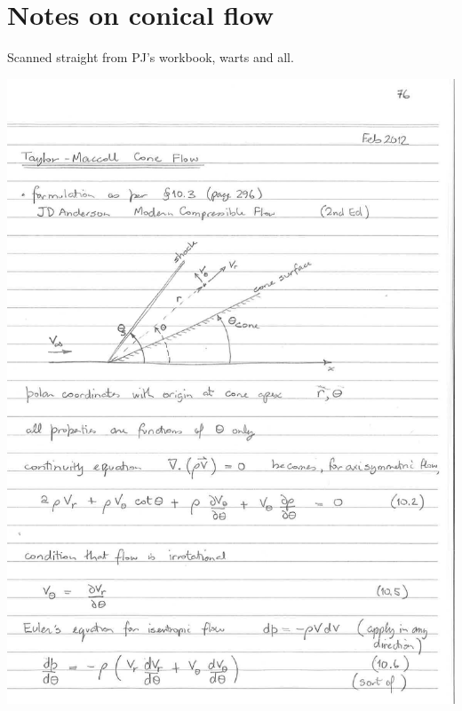 \documentclass[landscape,12pt,a4paper]{article}
\begin{document}


\newpage
\section{Notes on conical flow}
\label{pj-notes-cone-flow}
%
Scanned straight from PJ's workbook, warts and all.

\begin{center}
\includegraphics[width=0.9\textheight,angle=90]{../figs/pj-workbook-page-76.png}
\end{center}
\end{document}
